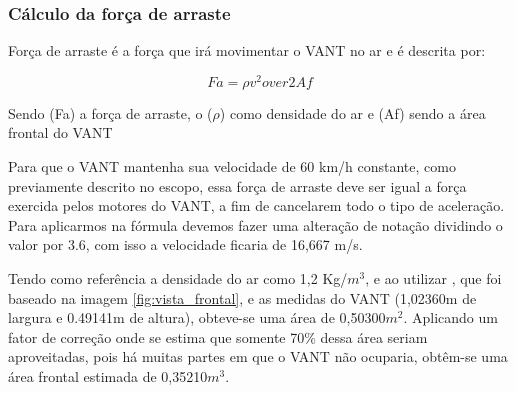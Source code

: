 % 
% 
% 
% 
% 

\subsubsection{Cálculo da força de arraste}

Força de arraste é a força que irá movimentar o VANT no ar e é descrita por:

\begin{equation}
 Fa = \rho {v}^2 over {2} Af
\end{equation}

Sendo (Fa) a força de arraste, o ($\rho$) como densidade do ar e  (Af) sendo a área frontal do VANT

Para que o VANT mantenha sua velocidade de 60 km/h constante, como previamente 
descrito no escopo, essa força de arraste deve ser igual a força exercida pelos 
motores do VANT, a fim de cancelarem todo o tipo de aceleração. Para aplicarmos na 
fórmula devemos fazer uma alteração de notação dividindo o valor por 3.6, com isso a 
velocidade ficaria de 16,667 m/s.

Tendo como referência a densidade do ar como  1,2 Kg/$m^3$, e ao utilizar , que
foi baseado na imagem \ref{fig:vista_frontal}, e as medidas do VANT 
(1,02360m de largura e 0.49141m de altura), obteve-se  uma área de 0,50300$m^2$. 
Aplicando  um fator de correção onde se estima que somente 70\% dessa área seriam
aproveitadas, pois há muitas partes em que o VANT não ocuparia, obtêm-se uma área
frontal estimada de 0,35210$m^3$. 

